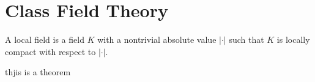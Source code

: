 \setchapterpreamble[u]{\margintoc}
\chapter{Class Field Theory}

\begin{definition}
    A local field is a field $K$ with a nontrivial absolute value $|\cdot|$ such that $K$ is locally compact with respect to $|\cdot|$.
\end{definition}

\begin{theorem}
    thjis is a theorem
\end{theorem}